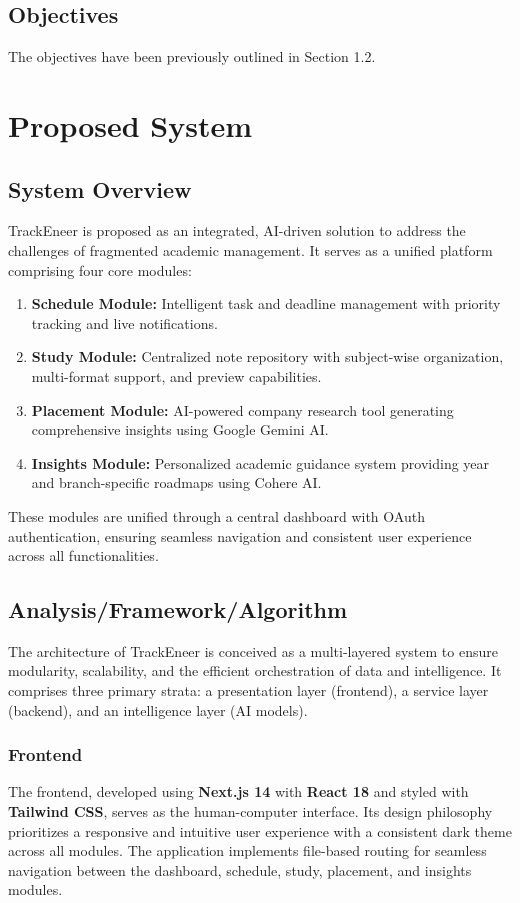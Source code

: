 \documentclass[12pt]{article}
\begin{document}
\subsection{Objectives}
The objectives have been previously outlined in Section 1.2.

\section{Proposed System}
\subsection{System Overview}
TrackEneer is proposed as an integrated, AI-driven solution to address the challenges of fragmented academic management. It serves as a unified platform comprising four core modules:

\begin{enumerate}
    \item \textbf{Schedule Module:} Intelligent task and deadline management with priority tracking and live notifications.
    \item \textbf{Study Module:} Centralized note repository with subject-wise organization, multi-format support, and preview capabilities.
    \item \textbf{Placement Module:} AI-powered company research tool generating comprehensive insights using Google Gemini AI.
    \item \textbf{Insights Module:} Personalized academic guidance system providing year and branch-specific roadmaps using Cohere AI.
\end{enumerate}

These modules are unified through a central dashboard with OAuth authentication, ensuring seamless navigation and consistent user experience across all functionalities.

\subsection{Analysis/Framework/Algorithm}
The architecture of TrackEneer is conceived as a multi-layered system to ensure modularity, scalability, and the efficient orchestration of data and intelligence. It comprises three primary strata: a presentation layer (frontend), a service layer (backend), and an intelligence layer (AI models).

\subsubsection{Frontend}
The frontend, developed using \textbf{Next.js 14} with \textbf{React 18} and styled with \textbf{Tailwind CSS}, serves as the human-computer interface. Its design philosophy prioritizes a responsive and intuitive user experience with a consistent dark theme across all modules. The application implements file-based routing for seamless navigation between the dashboard, schedule, study, placement, and insights modules.
\end{document}
